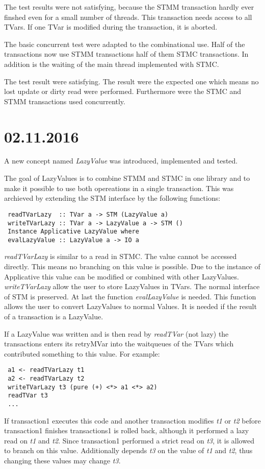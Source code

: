 \documentclass[a4paper,10pt]{article}
\begin{document}
The test results were not satisfying, because the STMM transaction hardly ever finshed even for a small 
number of threads. This transaction needs access to all TVars. If one TVar is modified during the transaction,
it is aborted. 

The basic concurrent test were adapted to the combinational use. Half of the transactions now use STMM transactions
half of them STMC transactions. In addition is the waiting of the main thread implemented with STMC.

The test result were satisfying. The result were the expected one which means no lost update or dirty read were performed.
Furthermore were the STMC and STMM transactions used concurrently.

\section{02.11.2016}
A new concept named \textit{LazyValue} was introduced, implemented and tested.

The goal of LazyValues is to combine STMM and STMC in one library and to make it possible to use
both opereations in a single transaction. This was archieved by extending the STM interface by the following
functions:
\begin{lstlisting}
 readTVarLazy  :: TVar a -> STM (LazyValue a)
 writeTVarLazy :: TVar a -> LazyValue a -> STM ()
 Instance Applicative LazyValue where
 evalLazyValue :: LazyValue a -> IO a
\end{lstlisting}
\textit{readTVarLazy} is similar to a read in STMC. The value cannot be accessed directly. This means no branching 
on this value is possible. Due to the instance of Applicative this value can be modified or combined with other
LazyValues. \textit{writeTVarLazy} allow the user to store LazyValues in TVars. 
The normal interface of STM is preserved.
At last the function \textit{evalLazyValue} is needed. This function allows the user to convert LazyValues to
normal Values. It is needed if the result of a transaction is a LazyValue.

If a LazyValue was written and is then read by \textit{readTVar} (not lazy) the transactions enters its retryMVar
into the waitqueues of the TVars which contributed something to this value. For example:
\begin{lstlisting}
 a1 <- readTVarLazy t1
 a2 <- readTVarLazy t2
 writeTVarLazy t3 (pure (+) <*> a1 <*> a2)
 readTVar t3
 ... 
\end{lstlisting}
If transaction1 executes this code and another transaction modifies \textit{t1} or \textit{t2} before 
transaction1 finishes transactions1 is rolled back, although it performed a lazy read on \textit{t1} 
and \textit{t2}. Since transaction1 performed a strict read on \textit{t3}, it is allowed to branch on 
this value. Additionally depends \textit{t3} on the value of \textit{t1} and \textit{t2}, thus 
changing these values may change \textit{t3}.
\end{document}

